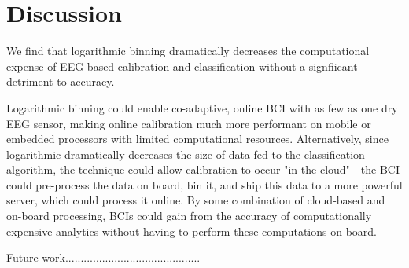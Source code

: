 \section{Discussion}

We find that logarithmic binning dramatically decreases the computational expense of EEG-based calibration and classification without a signfiicant detriment to accuracy. 

Logarithmic binning could enable co-adaptive, online BCI with as few as one dry EEG sensor, making online calibration much more performant on mobile or embedded processors with limited computational resources. Alternatively, since logarithmic dramatically decreases the size of data fed to the classification algorithm, the technique could allow calibration to occur "in the cloud" - the BCI could pre-process the data on board, bin it, and ship this data to a more powerful server, which could process it online. By some combination of cloud-based and on-board processing, BCIs could gain from the accuracy of computationally expensive analytics without having to perform these computations on-board.


Future work............................................